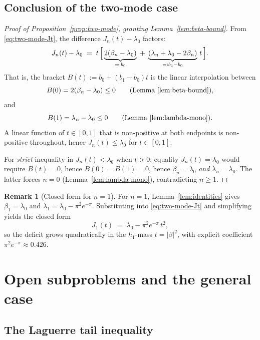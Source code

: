 \documentclass[11pt]{article}
\theoremstyle{definition}
\newtheorem{remark}[theorem]{Remark}
\begin{document}
\subsection{Conclusion of the two-mode case}

\begin{proof}[Proof of Proposition~\ref{prop:two-mode}, granting Lemma~\ref{lem:beta-bound}]
From \eqref{eq:two-mode-Jt}, the difference $J_{n}(t)-\lambda_{0}$ factors:
\[
  J_{n}(t)-\lambda_{0}
  \;=\; t\,\Bigl[\,\underbrace{2(\beta_{n}-\lambda_{0})}_{=:b_{0}}
              \;+\;\underbrace{(\lambda_{n}+\lambda_{0}-2\beta_{n})}_{=:b_{1}-b_{0}}\,t\,\Bigr].
\]
That is, the bracket $B(t):=b_{0}+(b_{1}-b_{0})t$ is the linear interpolation
between
\[
  B(0)=2(\beta_{n}-\lambda_{0})\le 0\qquad(\text{Lemma~\ref{lem:beta-bound}}),
\]
and
\[
  B(1)=\lambda_{n}-\lambda_{0}\le 0\qquad(\text{Lemma~\ref{lem:lambda-mono}}).
\]
A linear function of $t\in[0,1]$ that is non-positive at both endpoints is
non-positive throughout, hence $J_{n}(t)\le\lambda_{0}$ for $t\in[0,1]$.

For \emph{strict} inequality in $J_{n}(t)<\lambda_{0}$ when $t>0$: equality
$J_{n}(t)=\lambda_{0}$ would require $B(t)=0$, hence $B(0)=B(1)=0$, hence
$\beta_{n}=\lambda_{0}$ \emph{and} $\lambda_{n}=\lambda_{0}$.  The latter
forces $n=0$ (Lemma~\ref{lem:lambda-mono}), contradicting $n\ge 1$.
\end{proof}

\begin{remark}[Closed form for $n=1$]
For $n=1$, Lemma~\ref{lem:identities} gives $\beta_{1}=\lambda_{0}$ and
$\lambda_{1}=\lambda_{0}-\pi^{2}e^{-\pi}$.  Substituting into
\eqref{eq:two-mode-Jt} and simplifying yields the closed form
\[
  J_{1}(t) \;=\; \lambda_{0} - \pi^{2}e^{-\pi}\,t^{2},
\]
so the deficit grows quadratically in the $h_{1}$-mass $t=|\beta|^{2}$, with
explicit coefficient $\pi^{2}e^{-\pi}\approx 0.426$.
\end{remark}

\section{Open subproblems and the general case}\label{sec:open}

\subsection{The Laguerre tail inequality}
\end{document}
